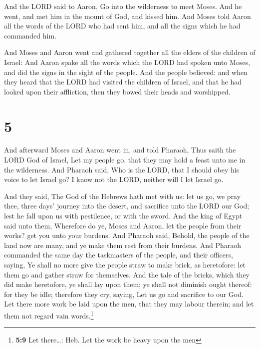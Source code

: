  And the LORD said to Aaron, Go into the wilderness to
meet Moses. And he went, and met him in the mount of God, and kissed
him.  And Moses told Aaron all the words of the LORD who
had sent him, and all the signs which he had commanded him.

 And Moses and Aaron went and gathered together all the
elders of the children of Israel:  And Aaron spake all
the words which the LORD had spoken unto Moses, and did the signs in the
sight of the people.  And the people believed: and when
they heard that the LORD had visited the children of Israel, and that he
had looked upon their affliction, then they bowed their heads and
worshipped.

\hypertarget{section-4}{%
\section{5}\label{section-4}}

 And afterward Moses and Aaron went in, and told Pharaoh,
Thus saith the LORD God of Israel, Let my people go, that they may hold
a feast unto me in the wilderness.  And Pharaoh said, Who
is the LORD, that I should obey his voice to let Israel go? I know not
the LORD, neither will I let Israel go.

 And they said, The God of the Hebrews hath met with us:
let us go, we pray thee, three days' journey into the desert, and
sacrifice unto the LORD our God; lest he fall upon us with pestilence,
or with the sword.  And the king of Egypt said unto them,
Wherefore do ye, Moses and Aaron, let the people from their works? get
you unto your burdens.  And Pharaoh said, Behold, the
people of the land now are many, and ye make them rest from their
burdens.  And Pharaoh commanded the same day the
taskmasters of the people, and their officers, saying,  Ye
shall no more give the people straw to make brick, as heretofore: let
them go and gather straw for themselves.  And the tale of
the bricks, which they did make heretofore, ye shall lay upon them; ye
shall not diminish ought thereof: for they be idle; therefore they cry,
saying, Let us go and sacrifice to our God.  Let there
more work be laid upon the men, that they may labour therein; and let
them not regard vain words.\footnote{\textbf{5:9} Let there\ldots: Heb.
  Let the work be heavy upon the men}

